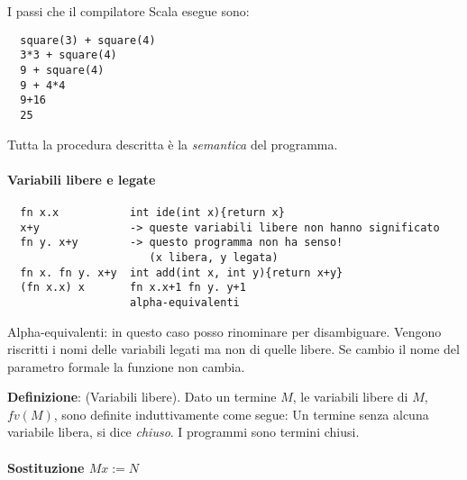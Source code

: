 I passi che il compilatore Scala esegue sono:
\begin{verbatim}
  square(3) + square(4)
  3*3 + square(4)
  9 + square(4)
  9 + 4*4
  9+16
  25
\end{verbatim}
Tutta la procedura descritta è la \textit{semantica} del programma.

\paragraph*{Variabili libere e legate}
\begin{verbatim}
  fn x.x           int ide(int x){return x}
  x+y              -> queste variabili libere non hanno significato
  fn y. x+y        -> questo programma non ha senso!
                      (x libera, y legata)
  fn x. fn y. x+y  int add(int x, int y){return x+y}
  (fn x.x) x       fn x.x+1 fn y. y+1
                   alpha-equivalenti
\end{verbatim}
Alpha-equivalenti: in questo caso posso rinominare per disambiguare. Vengono
riscritti i nomi delle variabili legati ma non di quelle libere. Se cambio il
nome del parametro formale la funzione non cambia.

\textbf{Definizione}: (Variabili libere). Dato un termine $M$, le variabili
libere di $M$, $fv(M)$, sono definite induttivamente come segue:
Un termine senza alcuna variabile libera, si dice \textit{chiuso}. I programmi
sono termini chiusi.

\paragraph{Sostituzione $M{x:=N}$}
